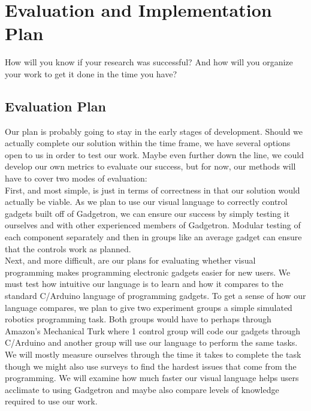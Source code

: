 \documentclass[12pt]{article}
\begin{document}
\section{Evaluation and Implementation Plan}
How will you know if your research was successful?  And how will you organize your work to get it done in the time you have?

\subsection{Evaluation Plan}
Our plan is probably going to stay in the early stages of development. Should we actually complete our solution within the time frame, we have several options open to us in order to test our work. Maybe even further down the line, we could develop our own metrics to evaluate our success, but for now, our methods will have to cover two modes of evaluation:\\[7pt]
First, and most simple, is just in terms of correctness in that our solution would actually be viable. As we plan to use our visual language to correctly control gadgets built off of Gadgetron, we can ensure our success by simply testing it ourselves and with other experienced members of Gadgetron. Modular testing of each component separately and then in groups like an average gadget can ensure that the controls work as planned.\\[7pt]
Next, and more difficult, are our plans for evaluating whether visual programming makes programming electronic gadgets easier for new users. We must test how intuitive our language is to learn and how it compares to the standard C/Arduino language of programming gadgets. To get a sense of how our language compares, we plan to give two experiment groups a simple simulated robotics programming task. Both groups would have to  perhaps through Amazon's Mechanical Turk where 1 control group will code our gadgets through C/Arduino and another group will use our language to perform the same tasks. We will mostly measure ourselves through the time it takes to complete the task though we might also use surveys to find the hardest issues that come from the programming. We will examine how much faster our visual language helps users acclimate to using Gadgetron and maybe also compare levels of knowledge required to use our work.
\end{document}
